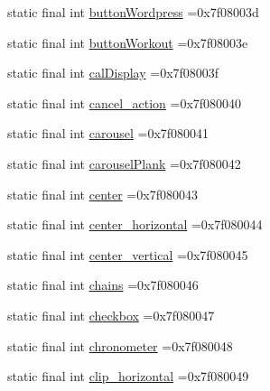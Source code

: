 \begin{DoxyCompactItemize}
\item 
static final int \mbox{\hyperlink{classcom_1_1example_1_1trainawearapplication_1_1_r_1_1id_ae4d4638c909418cca5002814ed7f10eb}{button\+Wordpress}} =0x7f08003d
\item 
static final int \mbox{\hyperlink{classcom_1_1example_1_1trainawearapplication_1_1_r_1_1id_a02bf1874e79168091af5b82b73d0791a}{button\+Workout}} =0x7f08003e
\item 
static final int \mbox{\hyperlink{classcom_1_1example_1_1trainawearapplication_1_1_r_1_1id_aeb331895d294b1721193defd5f0344d8}{cal\+Display}} =0x7f08003f
\item 
static final int \mbox{\hyperlink{classcom_1_1example_1_1trainawearapplication_1_1_r_1_1id_a7c55f0a4accd327dcc3f78ee690c9dc5}{cancel\+\_\+action}} =0x7f080040
\item 
static final int \mbox{\hyperlink{classcom_1_1example_1_1trainawearapplication_1_1_r_1_1id_a0761ac4461bf35ea0d75ea178dec7d49}{carousel}} =0x7f080041
\item 
static final int \mbox{\hyperlink{classcom_1_1example_1_1trainawearapplication_1_1_r_1_1id_a5dfa6c61870bf12d77b4d7ca07931f9d}{carousel\+Plank}} =0x7f080042
\item 
static final int \mbox{\hyperlink{classcom_1_1example_1_1trainawearapplication_1_1_r_1_1id_abee89826dff8a33a293fab50ce416d93}{center}} =0x7f080043
\item 
static final int \mbox{\hyperlink{classcom_1_1example_1_1trainawearapplication_1_1_r_1_1id_a9ec59161b8e78f6ae1f463ef38839146}{center\+\_\+horizontal}} =0x7f080044
\item 
static final int \mbox{\hyperlink{classcom_1_1example_1_1trainawearapplication_1_1_r_1_1id_a1b60489f0f2986e0d5219a44e8ac7a3e}{center\+\_\+vertical}} =0x7f080045
\item 
static final int \mbox{\hyperlink{classcom_1_1example_1_1trainawearapplication_1_1_r_1_1id_a5fce88e20a2cff9ff41ca9d628006383}{chains}} =0x7f080046
\item 
static final int \mbox{\hyperlink{classcom_1_1example_1_1trainawearapplication_1_1_r_1_1id_a8006aeb1a7d75ca4a865c43cb2f1694d}{checkbox}} =0x7f080047
\item 
static final int \mbox{\hyperlink{classcom_1_1example_1_1trainawearapplication_1_1_r_1_1id_ac14c4f8e1b26d97336a2f94082b9b2c6}{chronometer}} =0x7f080048
\item 
static final int \mbox{\hyperlink{classcom_1_1example_1_1trainawearapplication_1_1_r_1_1id_ad1097e19d9bdc0901b8707fabcc09a92}{clip\+\_\+horizontal}} =0x7f080049

\end{DoxyCompactItemize}
